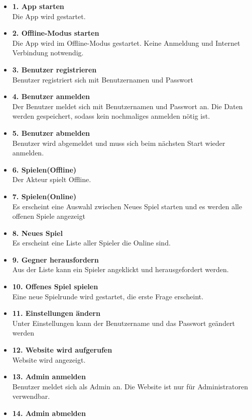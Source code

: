 \documentclass[fontsize=12pt,paper=a4,twoside]{scrartcl}
\begin{document}
\begin{itemize}
	\item \textbf{1. App starten}\\
	Die App wird gestartet. 
	\item \textbf{2. Offline-Modus starten}\\
	Die App wird im Offline-Modus gestartet. Keine Anmeldung und Internet Verbindung notwendig.
	\item \textbf{3. Benutzer registrieren}\\
	Benutzer registriert sich mit Benutzernamen und Passwort
	\item \textbf{4. Benutzer anmelden}\\
	Der Benutzer meldet sich mit Benutzernamen und Passwort an. Die Daten werden gespeichert, sodass kein nochmaliges anmelden nötig ist.
	\item \textbf{5. Benutzer abmelden}\\
	Benutzer wird abgemeldet und muss sich beim nächsten Start wieder anmelden.
	\item \textbf{6. Spielen(Offline)}\\
	Der Akteur spielt Offline.
	\item \textbf{7. Spielen(Online)}\\
	Es erscheint eine Auswahl zwischen Neues Spiel starten
	und es werden alle offenen Spiele angezeigt
	\item \textbf{8. Neues Spiel}\\
	Es erscheint eine Liste aller Spieler die Online sind.
	\item \textbf{9. Gegner herausfordern}\\
	Aus der Liste kann ein Spieler angeklickt und herausgefordert werden.
	\item \textbf{10. Offenes Spiel spielen}\\
	Eine neue Spielrunde wird gestartet, die erste Frage erscheint.
	\item \textbf{11. Einstellungen ändern}\\
	Unter Einstellungen kann der Benutzername und das Passwort geändert werden
	\item \textbf{12. Website wird aufgerufen}\\
	Website wird angezeigt.
	\item \textbf{13. Admin anmelden}\\
	Benutzer meldet sich als Admin an. Die Website ist nur für Administratoren verwendbar.
	\item \textbf{14. Admin abmelden}\\

\end{itemize}
\end{document}
